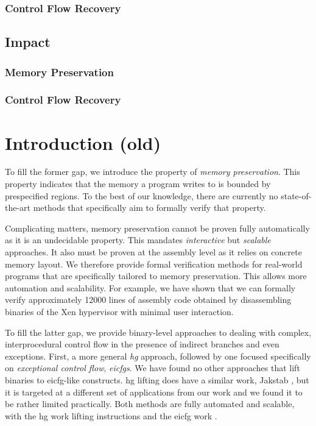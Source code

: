 \subsection{Control Flow Recovery}

\section{Impact}

\subsection{Memory Preservation}

\subsection{Control Flow Recovery}





\chapter{Introduction (old)}

To fill the former gap, we introduce the property of \emph{memory preservation}.
This property indicates that the memory a program writes to is bounded by prespecified regions.
To the best of our knowledge, there are currently no state-of-the-art methods that specifically aim to formally verify that property.

Complicating matters, memory preservation cannot be proven fully automatically as it is an undecidable property.
This mandates \emph{interactive} but \emph{scalable} approaches.
It also must be proven at the assembly level as it relies on concrete memory layout.
We therefore provide formal verification methods for real-world programs that are specifically tailored to memory preservation.
This allows more automation and scalability.
For example, we have shown that we can formally verify approximately \num{12000} lines of assembly code obtained by disassembling binaries of the Xen hypervisor \autocite{xen} with minimal user interaction.

To fill the latter gap, we provide binary-level approaches to dealing with complex, interprocedural control flow in the presence of indirect branches and even exceptions.
First, a more general \emph{\ac{hg}} approach, followed by one focused specifically on \emph{exceptional control flow}, \emph{\acp{eicfg}}.
We have found no other approaches that lift binaries to \ac{eicfg}-like constructs.
\Ac{hg} lifting does have a similar work, Jakstab \autocite{kinder2010static,kinder2012alternating,kinder2012virtualization}, but it is targeted at a different set of applications from our work and we found it to be rather limited practically.
Both methods are fully automated and scalable, with the \ac{hg} work lifting  instructions and the \ac{eicfg} work .

